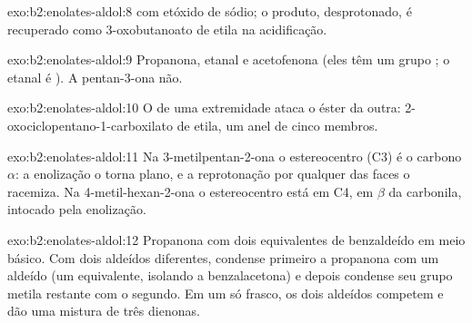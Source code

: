 \begin{solution}{exo:b2:enolates-aldol:8}
 com etóxido de sódio; o produto, desprotonado, é
recuperado como 3-oxobutanoato de etila na acidificação.
\end{solution}

\begin{solution}{exo:b2:enolates-aldol:9}
Propanona, etanal e acetofenona (eles têm um grupo ; o etanal é ).
A pentan-3-ona não.
\end{solution}

\begin{solution}{exo:b2:enolates-aldol:10}
O  de uma extremidade ataca o éster da outra: 2-oxociclopentano-1-carboxilato de etila, um
anel de cinco membros.
\end{solution}

\begin{solution}{exo:b2:enolates-aldol:11}
Na 3-metilpentan-2-ona o estereocentro (C3) é o carbono $\alpha$: a enolização o torna plano, e a
reprotonação por qualquer das faces o racemiza. Na 4-metil-hexan-2-ona o estereocentro está em C4,
em $\beta$ da carbonila, intocado pela enolização.
\end{solution}

\begin{solution}{exo:b2:enolates-aldol:12}
Propanona com dois equivalentes de benzaldeído em meio básico. Com dois aldeídos diferentes,
condense primeiro a propanona com um aldeído (um equivalente, isolando a benzalacetona) e depois
condense seu grupo metila restante com o segundo. Em um só frasco, os dois aldeídos competem e dão
uma mistura de três dienonas.
\end{solution}

